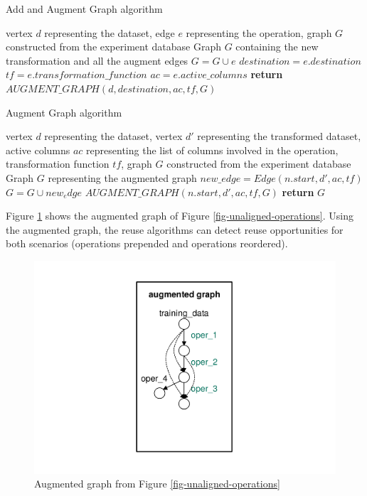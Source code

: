 \begin{algorithm}
\caption{Add and Augment Graph algorithm}\label{alg-add-augment-graph}
\begin{algorithmic}[1]
\Require vertex $d$ representing the dataset, edge $e$ representing the operation, graph $G$ constructed from the experiment database
\Ensure Graph $G$ containing the new transformation and all the augment edges
	\State $G = G \cup e$ 
	\State $destination = e.destination$ 
	\State $tf=e.transformation\_function$ 
	\State $ac=e.active\_columns$ 
	\State \textbf{return} $AUGMENT\_GRAPH(d, destination,ac, tf, G)$   
\EndFunction
\end{algorithmic}
\end{algorithm}

\begin{algorithm}
\caption{Augment Graph algorithm}\label{alg-augment-graph}
\begin{algorithmic}[1]
\Require vertex $d$ representing the dataset, vertex $d'$ representing the transformed dataset, active columns $ac$ representing the list of columns involved in the operation, transformation function $tf$, graph $G$ constructed from the experiment database
\Ensure Graph $G$ representing the augmented graph
			\State  $new\_edge=Edge(n.start, d', ac,tf)$
			\State $G = G \cup new_edge$
			\State  $AUGMENT\_GRAPH(n.start, d',ac, tf,G)$
		\EndIf
	\EndFor
   \State \textbf{return} $G$
\EndFunction
\end{algorithmic}
\end{algorithm}


Figure \ref{fig-augmented-graph} shows the augmented graph of Figure \ref{fig-unaligned-operations}.
Using the augmented graph, the reuse algorithms can detect reuse opportunities for both scenarios (operations prepended and operations reordered).

\begin{figure}
\centering
\includegraphics[width=0.33\columnwidth]{../images/augmented-graph}
\caption{Augmented graph from Figure \ref{fig-unaligned-operations} }
\label{fig-augmented-graph}
\end{figure}


